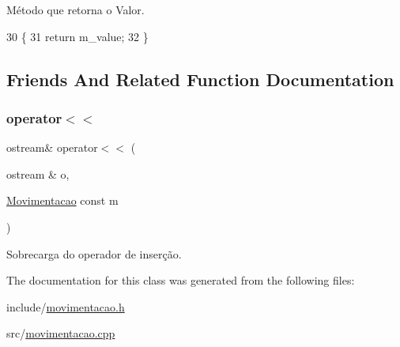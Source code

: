 Método que retorna o Valor. 


\begin{DoxyCode}
30     \{
31         \textcolor{keywordflow}{return} m\_value;
32     \}
\end{DoxyCode}


\subsection{Friends And Related Function Documentation}
\mbox{\label{classmovimento_1_1Movimentacao_ae2bda6f6c4b1aa1aee55b9b98885117d}} 
\subsubsection{\texorpdfstring{operator$<$$<$}{operator<<}}
{\footnotesize\ttfamily ostream\& operator$<$$<$ (\begin{DoxyParamCaption}\item[{ostream \&}]{o,  }\item[{\hyperlink{classmovimento_1_1Movimentacao}{Movimentacao} const}]{m }\end{DoxyParamCaption})\hspace{0.3cm}{\ttfamily [friend]}}



Sobrecarga do operador de inserção. 




The documentation for this class was generated from the following files\+:\begin{DoxyCompactItemize}
\item 
include/\hyperlink{movimentacao_8h}{movimentacao.\+h}\item 
src/\hyperlink{movimentacao_8cpp}{movimentacao.\+cpp}\end{DoxyCompactItemize}

